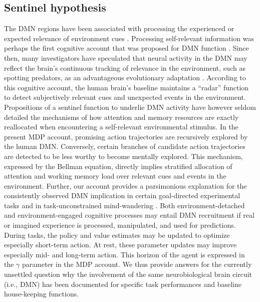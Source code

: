 \documentclass[10pt,letterpaper]{article}
\begin{document}
\subsection{Sentinel hypothesis}
The DMN regions have been associated with processing the
experienced or expected relevance of environment cues
\citep{montague2006imaging}.
Processing self-relevant information was perhaps the first
cognitive account that was proposed for DMN function
\citep{gusnard2001medial, raichle2001pnas}.
Since then,
many investigators have speculated that neural activity in the DMN
may reflect the brain's continuous tracking of
relevance in the environment, such as spotting predators,
as an advantageous evolutionary adaptation \citep{randy2008, hahn2007cingulate}.
According to this cognitive account, the human brain's baseline maintains
a ``radar'' function to
detect subjectively relevant cues and unexpected events in the environment.
Propositions of a sentinel function to underlie DMN activity
have however seldom detailed
the mechanisms of
how attention and memory resources are exactly reallocated when
encountering a self-relevant environmental stimulus.
In the present MDP account,
promising action trajectories
are recursively explored by the human DMN. Conversely,
certain branches of candidate action trajectories
are detected to be less worthy to become mentally explored.
This mechanism, expressed by the Bellman equation,
directly implies stratified allocation of attention and working memory load
over relevant cues and events in the environment.
%
Further,
our account provides a parsimonious explanation for
the consistently observed DMN implication
in certain goal-directed experimental tasks and
in task-unconstrained mind-wandering \citep{smith2009, bzdok2016formal}.
Both environment-detached and environment-engaged
cognitive processes may entail DMN recruitment
if real or imagined experience is processed, manipulated, and
used for predictions.
During tasks,
the policy and value estimates may be
updated to optimize especially short-term action.
At rest, these parameter updates may
improve especially mid- and long-term action.
This horizon of the agent
is expressed in the $\gamma$ parameter in the MDP account.
We thus provide answers for the currently unsettled question why the involvement
of the same neurobiological brain circuit (i.e., DMN) has been documented
for specific task performances and baseline house-keeping functions.
\end{document}
